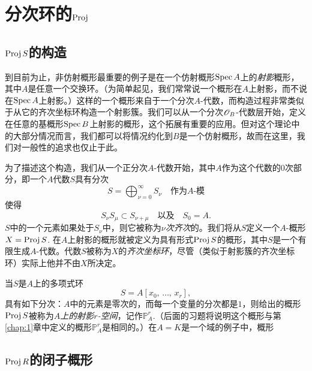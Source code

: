 \section{分次环的\texorpdfstring{$\operatorname{Proj}$}{Proj}}

\subsection{\texorpdfstring{$\operatorname{Proj} S$}{Proj S}的构造}

到目前为止，非仿射概形最重要的例子是在一个仿射概形$\operatorname{Spec} A$上的\textit{射影}概形，其中$A$是任意一个交换环。（为简单起见，我们常常说一个概形在$A$上射影，而不说在$\operatorname{Spec} A$上射影。）这样的一个概形来自于一个分次$A$-代数，而构造过程非常类似于从它的齐次坐标环构造一个射影簇。我们可以从一个分次$\mathscr{O}_B$-代数层开始，定义在任意的基概形$\operatorname{Spec} B$上射影的概形，这个拓展有重要的应用。但对这个理论中的大部分情况而言，我们都可以将情况约化到$B$是一个仿射概形，故而在这里，我们对一般性的追求也仅止于此。

为了描述这个构造，我们从一个正分次$A$-代数开始，其中$A$作为这个代数的$0$次部分，即一个$A$代数$S$具有分次
\[
	S=\bigoplus_{\nu=0}^\infty S_\nu\quad \text{作为$A$-模}
\]
使得
\[
	S_\nu S_\mu \subset S_{\nu+\mu}\quad \text{以及} \quad S_0=A.
\]
$S$中的一个元素如果处于$S_\nu$中，则它被称为\textit{$\nu$次齐次}的。我们将从$S$定义一个$A$-概形$X=\operatorname{Proj} S$. 在$A$上射影的概形就被定义为具有形式$\operatorname{Proj} S$的概形，其中$S$是一个有限生成$A$-代数。代数$S$被称为$X$的\textit{齐次坐标环}，尽管（类似于射影簇的齐次坐标环）实际上他并不由$X$所决定。

当$S$是$A$上的多项式环
\[
	S=A[\text{$x_0$, $\dots$, $x_r$}],
\]
具有如下分次：$A$中的元素是零次的，而每一个变量的分次都是$1$，则给出的概形$\operatorname{Proj} S$被称为\textit{$A$上的射影$r$-空间}，记作$\mathbb{P}_A^r$.（后面的习题将说明这个概形与第\ref{chap:1}章中定义的概形$\mathbb{P}_A^r$是相同的。）在$A=K$是一个域的例子中，概形

\subsection{\texorpdfstring{$\operatorname{Proj} R$}{Proj R}的闭子概形}